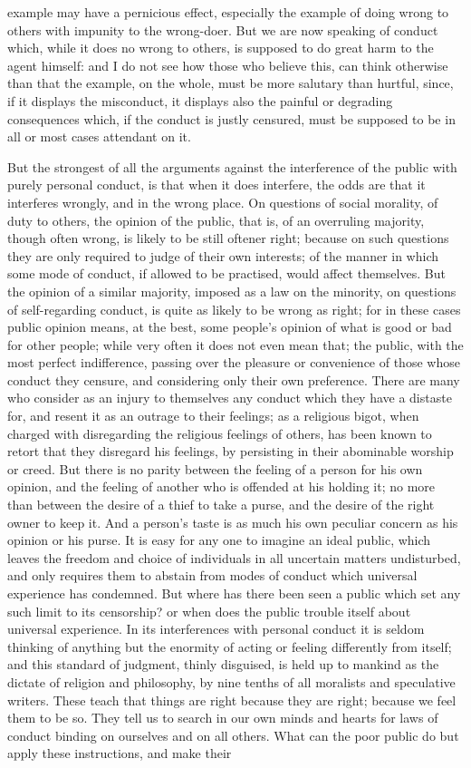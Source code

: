 \documentclass[12pt]{report}
\begin{document}
example may have a pernicious effect, especially the example of doing wrong to others with impunity to the wrong-doer. But we are now speaking of conduct which, while it does no wrong to others, is supposed to do great harm to the agent himself: and I do not see how those who believe this, can think otherwise than that the example, on the whole, must be more salutary than hurtful, since, if it displays the misconduct, it displays also the painful or degrading consequences which, if the conduct is justly censured, must be supposed to be in all or most cases attendant on it.

But the strongest of all the arguments against the interference of the public with purely personal conduct, is that when it does interfere, the odds are that it interferes wrongly, and in the wrong place. On questions of social morality, of duty to others, the opinion of the public, that is, of an overruling majority, though often wrong, is likely to be still oftener right; because on such questions they are only required to judge of their own interests; of the manner in which some mode of conduct, if allowed to be practised, would affect themselves. But the opinion of a similar majority, imposed as a law on the minority, on questions of self-regarding conduct, is quite as likely to be wrong as right; for in these cases public opinion means, at the best, some people's opinion of what is good or bad for other people; while very often it does not even mean that; the public, with the most perfect indifference, passing over the pleasure or convenience of those whose conduct they censure, and considering only their own preference. There are many who consider as an injury to themselves any conduct which they have a distaste for, and resent it as an outrage to their feelings; as a religious bigot, when charged with disregarding the religious feelings of others, has been known to retort that they disregard his feelings, by persisting in their abominable worship or creed. But there is no parity between the feeling of a person for his own opinion, and the feeling of another who is offended at his holding it; no more than between the desire of a thief to take a purse, and the desire of the right owner to keep it. And a person's taste is as much his own peculiar concern as his opinion or his purse. It is easy for any one to imagine an ideal public, which leaves the freedom and choice of individuals in all uncertain matters undisturbed, and only requires them to abstain from modes of conduct which universal experience has condemned. But where has there been seen a public which set any such limit to its censorship? or when does the public trouble itself about universal experience. In its interferences with personal conduct it is seldom thinking of anything but the enormity of acting or feeling differently from itself; and this standard of judgment, thinly disguised, is held up to mankind as the dictate of religion and philosophy, by nine tenths of all moralists and speculative writers. These teach that things are right because they are right; because we feel them to be so. They tell us to search in our own minds and hearts for laws of conduct binding on ourselves and on all others. What can the poor public do but apply these instructions, and make their 
\end{document}
